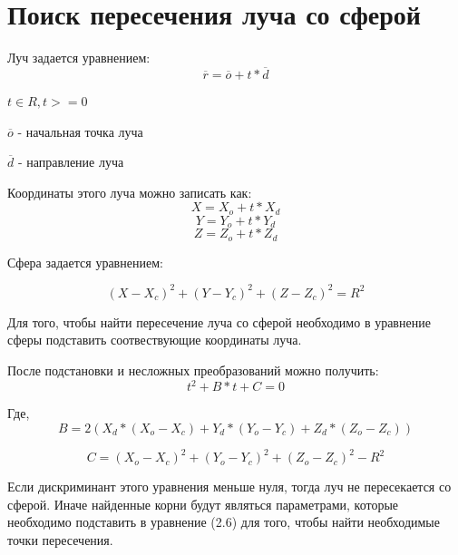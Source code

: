 \documentclass[12pt]{report}
\begin{document}
	\section{Поиск пересечения луча со сферой}
	
	Луч задается уравнением:
	\begin{equation}
		\overline{r} = \overline{o} + t*\overline{d}
	\end{equation}
	
	$t \in R, t >= 0$
	
	$\overline{o}$ - начальная точка луча
	
	$\overline{d}$ - направление луча
	
	Координаты этого луча можно записать как:
	\begin{equation}
		X = X_{o} + t*X_{d}
	\end{equation}
	\begin{equation}
		Y = Y_{o} + t*Y_{d}
	\end{equation}
	\begin{equation}
		Z = Z_{o} + t*Z_{d}
	\end{equation}
	
	Сфера задается уравнением:
		
	\begin{equation}
		(X - X_{c})^2 + (Y - Y_{c})^2 + (Z - Z_{c})^2 = R^2
	\end{equation}
	
	Для того, чтобы найти пересечение луча со сферой необходимо в уравнение сферы подставить соотвествующие координаты луча.
	
	После подстановки и несложных преобразований можно получить:
	\begin{equation}
		t^2 + B*t + C = 0
	\end{equation}
	
	Где,
	\begin{equation}
		B = 2(X_{d}*(X_{o} - X_{c}) + Y_{d}*(Y_{o} - Y_{c}) + Z_{d}*(Z_{o} - Z_{c}))
	\end{equation}
	
	\begin{equation}
		C = (X_{o} - X_{c})^2 + (Y_{o} - Y_{c})^2 + (Z_{o} - Z_{c})^2 - R^2
	\end{equation}
	
	Если дискриминант этого уравнения меньше нуля, тогда луч не пересекается со сферой. Иначе найденные корни будут являться параметрами, которые необходимо подставить в уравнение (2.6) для того, чтобы найти необходимые точки пересечения.
	
\end{document}
